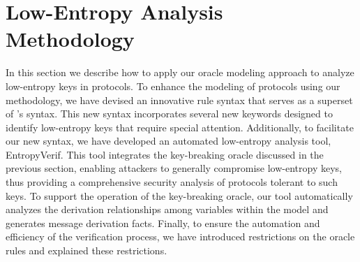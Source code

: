 \documentclass[../main.tex]{subfiles}  %
\begin{document}
\section{Low-Entropy Analysis Methodology} \label{sec:4extension-and-compilation}
% 



In this section we describe how to apply our oracle modeling approach to analyze low-entropy keys in protocols.
To enhance the modeling of protocols using our methodology, we have devised an innovative rule syntax that serves as a superset of \Tamarin{}'s syntax. 
This new syntax incorporates several new keywords designed to identify low-entropy keys that require special attention. 
Additionally, to facilitate our new syntax, we have developed an automated low-entropy analysis tool, EntropyVerif. 
This tool integrates the key-breaking oracle discussed in the previous section, enabling attackers to generally compromise low-entropy keys, thus providing a comprehensive security analysis of protocols tolerant to such keys. 
To support the operation of the key-breaking oracle, our tool automatically analyzes the derivation relationships among variables within the model and generates message derivation facts. 
Finally, to ensure the automation and efficiency of the verification process, we have introduced restrictions on the oracle rules and explained these restrictions.
\end{document}

